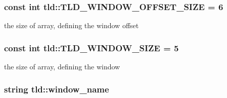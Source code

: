 \hypertarget{namespacetld_a7a647c1eaeda30086f4519b611db4e71}{
\subsubsection[{T\-L\-D\-\_\-\-W\-I\-N\-D\-O\-W\-\_\-\-O\-F\-F\-S\-E\-T\-\_\-\-S\-I\-Z\-E}]{\setlength{\rightskip}{0pt plus 5cm}const int tld\-::\-T\-L\-D\-\_\-\-W\-I\-N\-D\-O\-W\-\_\-\-O\-F\-F\-S\-E\-T\-\_\-\-S\-I\-Z\-E = 6\hspace{0.3cm}{\ttfamily [static]}}}\label{namespacetld_a7a647c1eaeda30086f4519b611db4e71}


the size of array, defining the window offset 

\hypertarget{namespacetld_ad0458a97a7973a088840e7917515c6ae}{
\subsubsection[{T\-L\-D\-\_\-\-W\-I\-N\-D\-O\-W\-\_\-\-S\-I\-Z\-E}]{\setlength{\rightskip}{0pt plus 5cm}const int tld\-::\-T\-L\-D\-\_\-\-W\-I\-N\-D\-O\-W\-\_\-\-S\-I\-Z\-E = 5\hspace{0.3cm}{\ttfamily [static]}}}\label{namespacetld_ad0458a97a7973a088840e7917515c6ae}


the size of array, defining the window 

\hypertarget{namespacetld_ad1bfc03770cc333da8a972ab7d35c246}{
\subsubsection[{window\-\_\-name}]{\setlength{\rightskip}{0pt plus 5cm}string tld\-::window\-\_\-name\hspace{0.3cm}{\ttfamily [static]}}}\label{namespacetld_ad1bfc03770cc333da8a972ab7d35c246}
